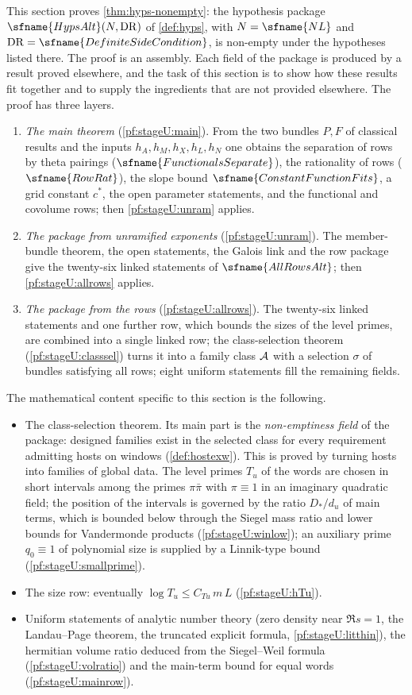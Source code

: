 This section proves \cref{thm:hyps-nonempty}: the hypothesis package $\sfname{HypsAlt}(N,\stageUDR)$ of \cref{def:hyps},
with $N=\sfname{NL}$ and $\stageUDR=\sfname{DefiniteSideCondition}$, is non-empty under the hypotheses
listed there. The proof is an assembly. Each field of the package is produced by a result proved elsewhere, and the
task of this section is to show how these results fit together and to supply the ingredients that are not provided
elsewhere. The proof has three layers.
\begin{enumerate}[label=(\arabic*)]
\item \emph{The main theorem} (\cref{pf:stageU:main}). From the two bundles $P,F$ of classical results and the
inputs $h_A,h_M,h_X,h_L,h_N$ one obtains the separation of rows by theta pairings ($\sfname{FunctionalsSeparate}$),
the rationality of rows ($\sfname{RowRat}$), the slope bound $\sfname{ConstantFunctionFits}$, a grid constant $c^*$, the
open parameter statements, and the functional and covolume rows; then \cref{pf:stageU:unram} applies.
\item \emph{The package from unramified exponents} (\cref{pf:stageU:unram}). The member-bundle theorem, the open
statements, the Galois link and the row package give the twenty-six linked statements of $\sfname{AllRowsAlt}$; then
\cref{pf:stageU:allrows} applies.
\item \emph{The package from the rows} (\cref{pf:stageU:allrows}). The twenty-six linked statements and one further row,
which bounds the sizes of the level primes, are combined into a single linked row; the class-selection theorem
(\cref{pf:stageU:classsel}) turns it into a family class $\mathcal{A}$ with a selection $\sigma$ of bundles satisfying all
rows; eight uniform statements fill the remaining fields.
\end{enumerate}
The mathematical content specific to this section is the following.
\begin{itemize}
\item The class-selection theorem. Its main part is the \emph{non-emptiness field} of the package: designed families
exist in the selected class for every requirement admitting hosts on windows (\cref{def:hostexw}). This is proved by
turning hosts into families of global data. The level primes $T_u$ of the words are chosen in short intervals among
the primes $\pi\bar\pi$ with $\pi\equiv1$ in an imaginary quadratic field; the position of the intervals is governed
by the ratio $D_*/d_u$ of main terms, which is bounded below through the Siegel mass ratio and lower bounds for
Vandermonde products (\cref{pf:stageU:winlow}); an auxiliary prime $q_0\equiv1$ of polynomial size is supplied by a
Linnik-type bound (\cref{pf:stageU:smallprime}).
\item The size row: eventually $\log T_u\le C_{Tu}\,m\,L$ (\cref{pf:stageU:hTu}).
\item Uniform statements of analytic number theory (zero density near $\Re s=1$, the Landau--Page theorem, the
truncated explicit formula, \cref{pf:stageU:litthin}), the hermitian volume ratio deduced from the Siegel--Weil formula
(\cref{pf:stageU:volratio}) and the main-term bound for equal words (\cref{pf:stageU:mainrow}).
\end{itemize}

